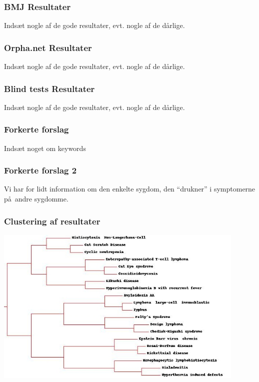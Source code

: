 \documentclass[xcolor=table]{beamer}
\begin{document}
\begin{frame}

  \frametitle{BMJ Resultater}

  Inds\ae t nogle af de gode resultater, evt. nogle af de d\aa rlige.

\end{frame}

\begin{frame}

  \frametitle{Orpha.net Resultater}

  Inds\ae t nogle af de gode resultater, evt. nogle af de d\aa rlige.

\end{frame}

\begin{frame}

  \frametitle{Blind tests Resultater}

  Inds\ae t nogle af de gode resultater, evt. nogle af de d\aa rlige.

\end{frame}

\begin{frame}

  \frametitle{Forkerte forslag}

  Inds\ae t noget om keywords

\end{frame}

\begin{frame}

  \frametitle{Forkerte forslag 2}

  Vi har for lidt information om den enkelte sygdom, den ``drukner'' i symptomerne p\aa\ andre sygdomme.

\end{frame}

\begin{frame}

  \frametitle{Clustering af resultater}

  \begin{center}
    \includegraphics[width=0.90\textwidth]{diagram/cluster_cat_scratch.jpg}
  \end{center}

\end{frame}
\end{document}
